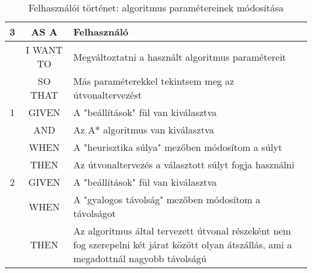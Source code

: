\begin{table}[H]
    \centering
    \begin{tabular}{|c|c|p{10cm}|}
        \hline
        \textbf{3}
        & AS A          & Felhasználó \\ \hline
        & I WANT TO     & Megváltoztatni a használt algoritmus paramétereit \\ \hline
        & SO THAT       & Más paraméterekkel tekintsem meg az útvonaltervezést \\ \hline
        \hline
        1 & GIVEN & A "beállítások" fül van kiválasztva \\ \hline
        & AND     & Az A* algoritmus van kiválasztva \\ \hline
        & WHEN    & A "heurisztika súlya" mezőben módosítom a súlyt \\ \hline
        & THEN    & Az útvonaltervezés a választott súlyt fogja használni \\ \hline
        \hline
        2 & GIVEN & A "beállítások" fül van kiválasztva \\ \hline
        & WHEN    & A "gyalogos távolság" mezőben módosítom a távolságot \\ \hline
        & THEN    & Az algoritmus által tervezett útvonal részeként nem fog szerepelni
                    két járat között olyan átszállás, ami a megadottnál nagyobb távolságú \\ \hline
    \end{tabular}
    \caption{Felhasználói történet: algoritmus paramétereinek módosítása}
    \label{tab:user-stories-parameters}
\end{table}

